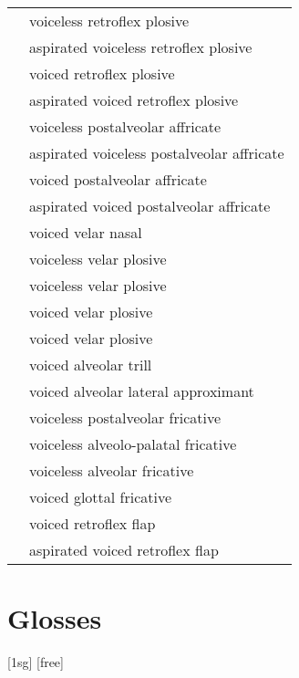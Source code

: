 \documentclass{article}
\begin{document}
\begin{xltabular}{\textwidth}{lL}
   & voiceless retroflex plosive \\
   & aspirated voiceless retroflex plosive \\
   & voiced retroflex plosive \\
   & aspirated voiced retroflex plosive \\
  \ipa{\t{\textteshlig}} & voiceless postalveolar affricate \\
   & aspirated voiceless postalveolar affricate \\
  \ipa{\t{\textdyoghlig}} & voiced postalveolar affricate \\
   & aspirated voiced postalveolar affricate \\
   & voiced velar nasal \\
   & voiceless velar plosive \\
   & voiceless velar plosive \\
   & voiced velar plosive \\
   & voiced velar plosive \\
   & voiced alveolar trill \\
   & voiced alveolar lateral approximant \\
   & voiceless postalveolar fricative \\
   & voiceless alveolo-palatal fricative \\
   & voiceless alveolar fricative \\
   & voiced glottal fricative \\
   & voiced retroflex flap \\
   & aspirated voiced retroflex flap \\
\end{xltabular}

\newpage\section{Glosses}

\ex[lingstyle=custom_nlevel]
\begingl
{}[{\sc 1sg}]
[free]
\endgl
\xe
\end{document}
